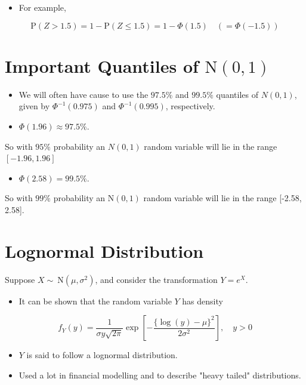 \documentclass[10pt]{article}
\begin{document}
\begin{itemize}
  \item For example,
\end{itemize}

$$
\mathrm{P}(Z>1.5)=1-\mathrm{P}(Z \leq 1.5)=1-\Phi(1.5) \quad(=\Phi(-1.5))
$$

\section*{Important Quantiles of $\mathrm{N}(0,1)$}
\begin{itemize}
  \item We will often have cause to use the $97.5 \%$ and $99.5 \%$ quantiles of $N(0,1)$, given by $\Phi^{-1}(0.975)$ and $\Phi^{-1}(0.995)$, respectively.
  \item $\Phi(1.96) \approx 97.5 \%$.
\end{itemize}

So with $95 \%$ probability an $N(0,1)$ random variable will lie in the range $[-1.96,1.96]$

\begin{itemize}
  \item $\Phi(2.58)=99.5 \%$.
\end{itemize}

So with $99 \%$ probability an $\mathrm{N}(0,1)$ random variable will lie in the range [-2.58, 2.58].

\section*{Lognormal Distribution}
Suppose $X \sim \mathrm{~N}\left(\mu, \sigma^{2}\right)$, and consider the transformation $Y=e^{X}$.

\begin{itemize}
  \item It can be shown that the random variable $Y$ has density
\end{itemize}

$$
f_{Y}(y)=\frac{1}{\sigma y \sqrt{2 \pi}} \exp \left[-\frac{\{\log (y)-\mu\}^{2}}{2 \sigma^{2}}\right], \quad y>0
$$

\begin{itemize}
  \item $Y$ is said to follow a lognormal distribution.
  \item Used a lot in financial modelling and to describe "heavy tailed" distributions.
\end{itemize}
\end{document}

